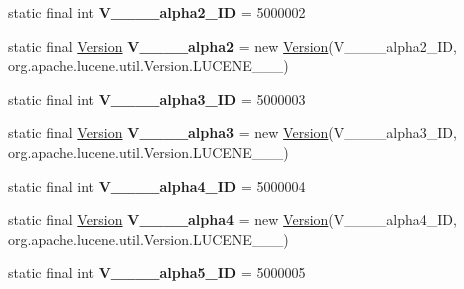 \begin{DoxyCompactItemize}
static final int {\bfseries V\+\_\+\_\+\_\+\_\+alpha2\+\_\+\+ID} = 5000002
\item 
\hypertarget{classorg_1_1elasticsearch_1_1_version_a9080f5b4edfe669cc10fd9ea9d205205}{}\label{classorg_1_1elasticsearch_1_1_version_a9080f5b4edfe669cc10fd9ea9d205205} 
static final \hyperlink{classorg_1_1elasticsearch_1_1_version}{Version} {\bfseries V\+\_\+\_\+\_\+\_\+alpha2} = new \hyperlink{classorg_1_1elasticsearch_1_1_version}{Version}(V\+\_\+\_\+\_\+\_\+alpha2\+\_\+\+ID, org.\+apache.\+lucene.\+util.\+Version.\+L\+U\+C\+E\+N\+E\+\_\+\_\+\_)
\item 
\hypertarget{classorg_1_1elasticsearch_1_1_version_a0f7b4f29dcbb6008374cd56a2537e2c3}{}\label{classorg_1_1elasticsearch_1_1_version_a0f7b4f29dcbb6008374cd56a2537e2c3} 
static final int {\bfseries V\+\_\+\_\+\_\+\_\+alpha3\+\_\+\+ID} = 5000003
\item 
\hypertarget{classorg_1_1elasticsearch_1_1_version_a46831965bc5cfc4746382e633a4c7142}{}\label{classorg_1_1elasticsearch_1_1_version_a46831965bc5cfc4746382e633a4c7142} 
static final \hyperlink{classorg_1_1elasticsearch_1_1_version}{Version} {\bfseries V\+\_\+\_\+\_\+\_\+alpha3} = new \hyperlink{classorg_1_1elasticsearch_1_1_version}{Version}(V\+\_\+\_\+\_\+\_\+alpha3\+\_\+\+ID, org.\+apache.\+lucene.\+util.\+Version.\+L\+U\+C\+E\+N\+E\+\_\+\_\+\_)
\item 
\hypertarget{classorg_1_1elasticsearch_1_1_version_a5114e00d8b49dfea2b61bc9375ae1efd}{}\label{classorg_1_1elasticsearch_1_1_version_a5114e00d8b49dfea2b61bc9375ae1efd} 
static final int {\bfseries V\+\_\+\_\+\_\+\_\+alpha4\+\_\+\+ID} = 5000004
\item 
\hypertarget{classorg_1_1elasticsearch_1_1_version_a678f7f03da039c9a8aaa83710b44cdda}{}\label{classorg_1_1elasticsearch_1_1_version_a678f7f03da039c9a8aaa83710b44cdda} 
static final \hyperlink{classorg_1_1elasticsearch_1_1_version}{Version} {\bfseries V\+\_\+\_\+\_\+\_\+alpha4} = new \hyperlink{classorg_1_1elasticsearch_1_1_version}{Version}(V\+\_\+\_\+\_\+\_\+alpha4\+\_\+\+ID, org.\+apache.\+lucene.\+util.\+Version.\+L\+U\+C\+E\+N\+E\+\_\+\_\+\_)
\item 
\hypertarget{classorg_1_1elasticsearch_1_1_version_a33489dda5808bc1f9df00c25d3ec241f}{}\label{classorg_1_1elasticsearch_1_1_version_a33489dda5808bc1f9df00c25d3ec241f} 
static final int {\bfseries V\+\_\+\_\+\_\+\_\+alpha5\+\_\+\+ID} = 5000005
\item 

\end{DoxyCompactItemize}
